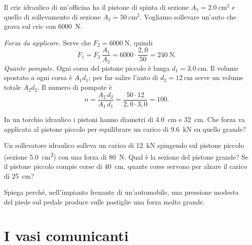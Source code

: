 \begin{testexample}
Il cric idraulico di un'officina ha il pistone di spinta di sezione $A_1 = \SI{2,0}{\centi\metre\squared}$ e quello di sollevamento di sezione $A_2 = \SI{50}{\centi\metre\squared}$. Vogliamo sollevare un'auto che grava sul cric con \SI{6000}{\newton}.

\emph{Forza da applicare.} Serve che $F_2 = \SI{6000}{\newton}$, quindi
\[ F_1 = F_2\,\frac{A_1}{A_2} = 6000 \cdot \frac{2{,}0}{50} = \SI{240}{\newton}. \]
\emph{Quante pompate.} Ogni corsa del pistone piccolo è lunga $d_1 = \SI{3,0}{\centi\metre}$. Il volume spostato a ogni corsa è $A_1 d_1$; per far salire l'auto di $d_2 = \SI{12}{\centi\metre}$ serve un volume totale $A_2 d_2$. Il numero di pompate è
\[ n = \frac{A_2\,d_2}{A_1\,d_1} = \frac{50 \cdot 12}{2{,}0 \cdot 3{,}0} = 100. \]
\end{testexample}

\begin{esercizio}
In un torchio idraulico i pistoni hanno diametri di \SI{4,0}{\centi\metre} e \SI{32}{\centi\metre}. Che forza va applicata al pistone piccolo per equilibrare un carico di \SI{9,6}{\kilo\newton} su quello grande?\\
\end{esercizio}

\begin{esercizio}
Un sollevatore idraulico solleva un carico di \SI{12}{\kilo\newton} spingendo sul pistone piccolo (sezione \SI{5,0}{\centi\metre\squared}) con una forza di \SI{80}{\newton}. Qual è la sezione del pistone grande? Se il pistone piccolo compie corse di \SI{40}{\centi\metre}, quante corse servono per alzare il carico di \SI{25}{\centi\metre}?\\
\end{esercizio}

\begin{esercizio}
Spiega perché, nell'impianto frenante di un'automobile, una pressione modesta del piede sul pedale produce sulle pastiglie una forza molto grande.\\
\end{esercizio}


\section{I vasi comunicanti}

